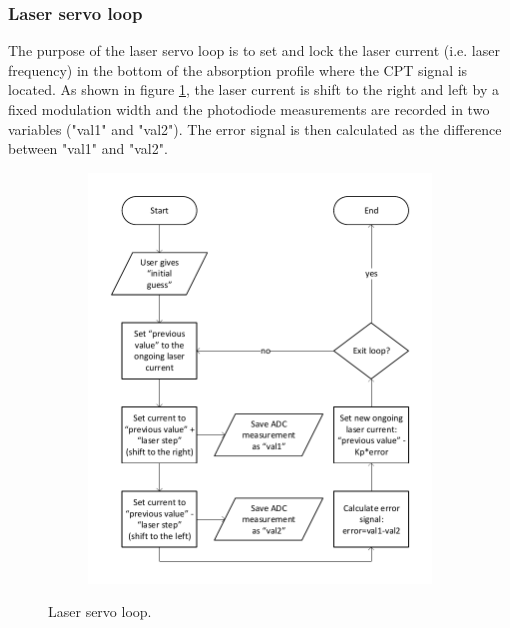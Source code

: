 \documentclass[a4paper,12pt]{article}
\newcounter{step}
\begin{document}
\subsubsection{Laser servo loop}



The purpose of the laser servo loop is to set and lock the laser current (i.e. laser frequency) in the bottom of the absorption profile where the CPT signal is located. As shown in figure \ref{fig:laser_servo_loop}, the laser current is shift to the right and left by a fixed modulation width and the photodiode measurements are recorded in two variables ("val1" and "val2"). The error signal is then calculated as the difference between "val1" and "val2".

\begin{figure}[!h]
\centering
\begin{subfigure}[c]{0.49\textwidth}
	\centering
	\captionsetup{justification=centering}
\end{subfigure}
\hfill
\begin{subfigure}[c]{0.49\textwidth}
	\centering
	\includegraphics[width=\textwidth]{Images/Laser_Servo_loop_flowchart.pdf}
	\captionsetup{justification=centering}
\end{subfigure}
 \caption{Laser servo loop.}
\label{fig:laser_servo_loop}
\end{figure}
\end{document}
